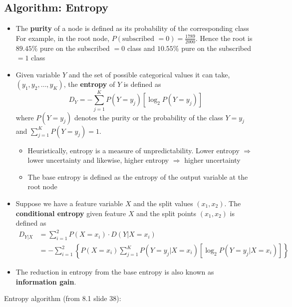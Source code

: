 \documentclass{article}
\begin{document}
\subsection{Algorithm: Entropy}
\begin{itemize}
    \item The \textbf{purity} of a node is defined as its probability of the corresponding class\\
    For example, in the root node, $P(\text{subscribed } = 0) = \frac{1789}{2000}$. Hence the root is $89.45\%$ pure on the subscribed $ = 0$ class and $10.55\%$ pure on the subscribed $ = 1$ class
    \item Given variable $Y$ and the set of possible categorical values it can take, $(y_1, y_2, \dots , y_K)$, the \textbf{entropy} of $Y$ is defined as
    $$D_Y = -\sum_{j=1}^{K}P(Y=y_j)[\log_2P(Y=y_j)]$$
    where $P(Y=y_j)$ denotes the purity or the probability of the class $Y=y_j$ and $\sum_{j=1}^{K}P(Y=y_j)=1$. 
    \begin{itemize}
        \item Heuristically, entropy is a measure of unpredictability. Lower entropy $\Rightarrow$ lower uncertainty and likewise, higher entropy $\Rightarrow$ higher uncertainty
        \item The base entropy is defined as the entropy of the output variable at the root node
    \end{itemize}
    \item Suppose we have a feature variable $X$ and the split values $(x_1,x_2)$. The \textbf{conditional entropy} given feature $X$ and the split points $(x_1, x_2)$ is defined as
    \begin{equation*}
        \begin{split}
            D_{Y|X} &= \sum_{i=1}^{2} P(X=x_i)\cdot D(Y|X=x_i)\\
            &= -\sum_{i=1}^{2}\left\{ P(X=x_i)\sum_{j=1}^{K}P(Y=y_j|X=x_i)\left[\log_2 P(Y=y_j|X=x_i)\right]\right\}
        \end{split}
    \end{equation*}
    \item The reduction in entropy from the base entropy is also known as \textbf{information gain}.
\end{itemize}
Entropy algorithm (from 8.1 slide 38):
\end{document}
